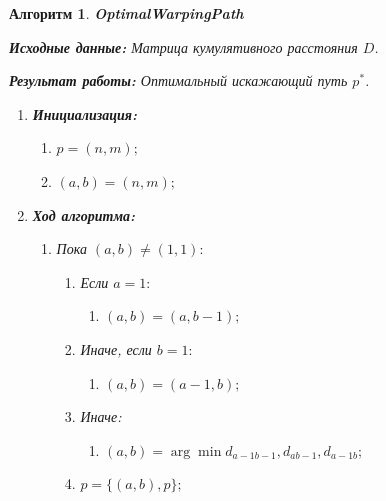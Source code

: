 \documentclass[a4paper, 14pt]{extarticle}
\numberwithin{figure}{subsection}
\numberwithin{equation}{subsection}
\newtheorem{algorithm}{Алгоритм}[subsection]
\begin{document}
\begin{algorithm} {\bf OptimalWarpingPath}

{\bf Исходные данные:} Матрица кумулятивного расстояния $D$.

{\bf Результат работы:} Оптимальный искажающий путь $p^*$.
\begin{enumerate}[parsep = 0pt]
\item {\bf Инициализация:}
\begin{enumerate}[1.,labelindent=0pt,labelsep=40pt,parsep = 0pt]
\setcounter{enumii}{\number\numexpr\value{enumi}}
\item $p = {(n, m)};$
\item $(a, b) = (n, m);$
\setcounter{enumi}{\number\numexpr\value{enumii}}
\end{enumerate}

\item {\bf Ход алгоритма:}
\begin{enumerate}[1.,labelindent=0pt,labelsep=40pt,parsep = 0pt]
\setcounter{enumii}{\number\numexpr\value{enumi}}
\item Пока $(a, b) \ne (1,1):$
\begin{enumerate}[1.,labelindent=0pt,labelsep=80pt,parsep = 0pt]
\setcounter{enumiii}{\number\numexpr\value{enumii}}
\item Если $a = 1:$
\begin{enumerate}[1.,labelindent=0pt,labelsep=147pt,parsep = 0pt]
\setcounter{enumiv}{\number\numexpr\value{enumiii}}
\item $(a,b)=(a,b-1);$
\setcounter{enumiii}{\number\numexpr\value{enumiv}}
\end{enumerate}
\item Иначе, если $b = 1:$
\begin{enumerate}[1.,labelindent=0pt,labelsep=147pt,parsep = 0pt]
\setcounter{enumiv}{\number\numexpr\value{enumiii}}
\item $(a,b)=(a-1,b);$
\setcounter{enumiii}{\number\numexpr\value{enumiv}}
\end{enumerate}
\item Иначе:
\begin{enumerate}[1.,labelindent=0pt,labelsep=147pt,parsep = 0pt]
\setcounter{enumiv}{\number\numexpr\value{enumiii}}
\item $(a,b)=\arg\min{d_{a-1 b-1},d_{a b-1}, d_{a-1 b}};$
\setcounter{enumiii}{\number\numexpr\value{enumiv}}
\end{enumerate}
\item $p = \{(a,b), p\};$
\setcounter{enumii}{\number\numexpr\value{enumiii}}
\end{enumerate}
\setcounter{enumi}{\number\numexpr\value{enumii}}
\end{enumerate}
\end{enumerate}
\end{algorithm}
\end{document}

